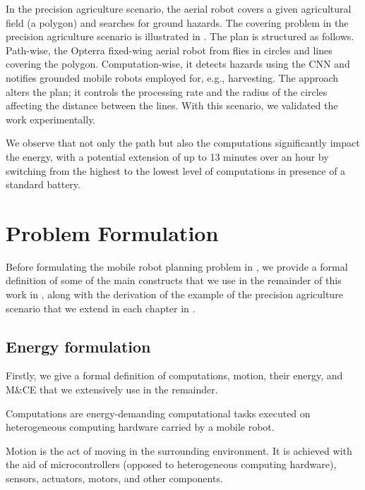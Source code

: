 In the precision agriculture scenario, the aerial robot covers a given agricultural field (a polygon) and searches for ground hazards. The covering problem in the precision agriculture scenario is illustrated in . The plan is structured as follows. Path-wise, the Opterra fixed-wing aerial robot from  flies in circles and lines covering the polygon. Computation-wise, it detects hazards using the CNN and notifies grounded mobile robots employed for, e.g., harvesting. The approach alters the plan; it controls the processing rate and the radius of the circles affecting the distance between the lines. With this scenario, we validated the work experimentally.

We observe that not only the path but also the computations significantly impact the energy, with a potential extension of up to 13 minutes over an hour by switching from the highest to the lowest level of computations in presence of a standard battery.


\section{Problem Formulation}
\label{sec:pb-form}

Before formulating the mobile robot planning problem in , we provide a formal definition of some of the main constructs that we use in the remainder of this work in , along with the derivation of the example of the precision agriculture scenario that we extend in each chapter in .

\subsection{Energy formulation}
\label{sec:definitions}

Firstly, we give a formal definition of computations, motion, their energy, and M\&CE that we extensively use in the remainder.

\begin{highlight}
  \begin{defn}\label{def:comps}
    Computations are energy-demanding computational tasks executed on heterogeneous computing hardware carried by a mobile robot.
    
    Motion is the act of moving in the surrounding environment. It is achieved with the aid of microcontrollers (opposed to heterogeneous computing hardware), sensors, actuators, motors, and other components. 
  \end{defn}
\end{highlight}

